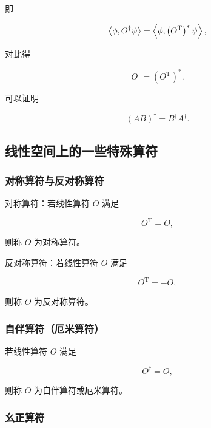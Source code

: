 即

\begin{equation}
\Braket{\phi , O^\dag \psi }
=\Braket{\phi , \left(O^\mathrm{T} \right)^* \psi },
\end{equation}

对比得

\begin{equation}
O^\dag = \left(O^\mathrm{T} \right)^*.
\end{equation}

可以证明

\begin{equation}
\left(A B \right)^\dag
=B^\dag A^\dag.
\end{equation}

\subsection{线性空间上的一些特殊算符}

\subsubsection{对称算符与反对称算符}

对称算符：若线性算符 $O $ 满足

\begin{equation}
O^\mathrm{T} = O,
\end{equation}

则称 $O $ 为对称算符。

反对称算符：若线性算符 $O $ 满足

\begin{equation}
O^\mathrm{T} = -O,
\end{equation}

则称 $O $ 为反对称算符。

\subsubsection{自伴算符（厄米算符）}

若线性算符 $O $ 满足

\begin{equation}
O^\dag = O,
\end{equation}

则称 $O $ 为自伴算符或厄米算符。

\subsubsection{幺正算符}

